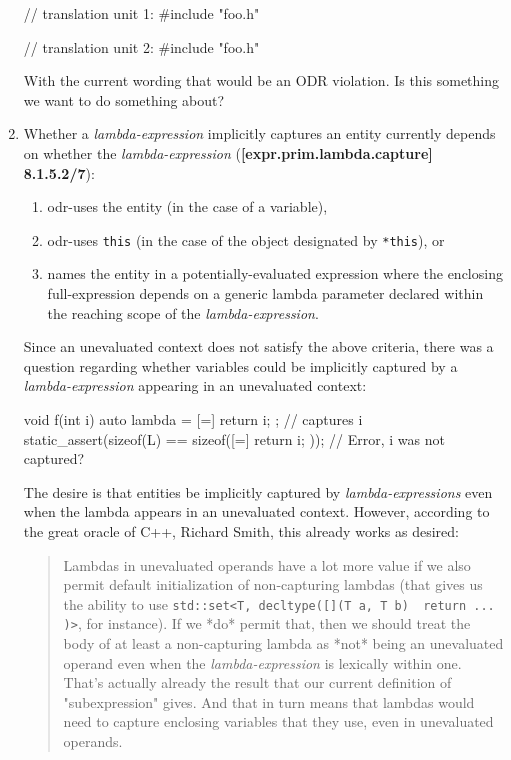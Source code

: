 \documentclass{wg21}
\newcommand{\cc}[1]{\texttt{#1}}
\begin{document}
\begin{enumerate}
\begin{cpp}
// translation unit 1:
#include "foo.h"

// translation unit 2:
#include "foo.h"
\end{cpp}

    With the current wording that would be an ODR violation. Is this something
    we want to do something about?


  \item \label{discussion.capture}
    Whether a \textit{lambda-expression} implicitly captures an entity
    currently depends on whether the \textit{lambda-expression}
    (\textbf{[expr.prim.lambda.capture] 8.1.5.2/7}):
    \begin{enumerate}
      \item odr-uses the entity (in the case of a variable),
      \item odr-uses \cc{this} (in the case of the object designated by \cc{*this}), or
      \item names the entity in a potentially-evaluated expression where the
            enclosing full-expression depends on a generic lambda parameter
            declared within the reaching scope of the \textit{lambda-expression}.
    \end{enumerate}

    Since an unevaluated context does not satisfy the above criteria, there
    was a question regarding whether variables could be implicitly captured
    by a \textit{lambda-expression} appearing in an unevaluated context:
\begin{cpp}
void f(int i) {
  auto lambda = [=]{ return i; }; // captures i
  static_assert(sizeof(L) == sizeof([=]{ return i; })); // Error, i was not captured?
}
\end{cpp}

    The desire is that entities be implicitly captured by \textit{lambda-expressions}
    even when the lambda appears in an unevaluated context. However, according
    to the great oracle of C++, Richard Smith, this already works as desired:

    \begin{quote}
      Lambdas in unevaluated operands have a lot more value if we also permit
      default initialization of non-capturing lambdas (that gives us the ability
      to use \cc{std::set<T, decltype([](T a, T b) { return ... })>}, for
      instance). If we *do* permit that, then we should treat the body of at
      least a non-capturing lambda as *not* being an unevaluated operand even
      when the \textit{lambda-expression} is lexically within one. That's
      actually already the result that our current definition of "subexpression"
      gives. And that in turn means that lambdas would need to capture
      enclosing variables that they use, even in unevaluated operands.
    \end{quote}


\end{enumerate}
\end{document}
